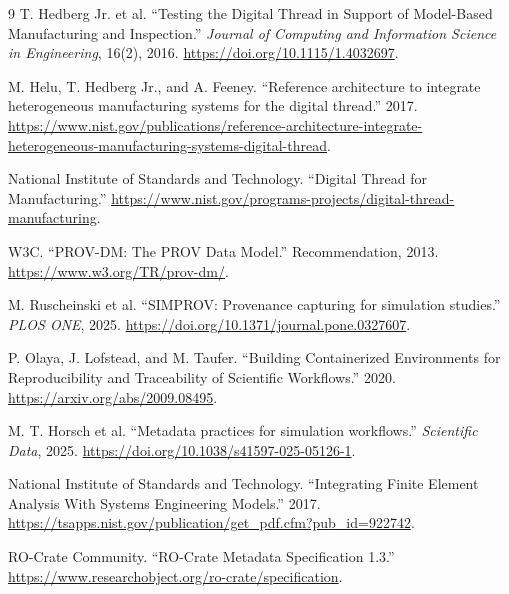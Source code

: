 \documentclass[10pt]{article}
\begin{document}
\begin{sloppypar}
\begin{thebibliography}{9}
T. Hedberg Jr. et al. ``Testing the Digital Thread in Support of Model-Based
Manufacturing and Inspection.'' \emph{Journal of Computing and Information
Science in Engineering}, 16(2), 2016. \url{https://doi.org/10.1115/1.4032697}.

M. Helu, T. Hedberg Jr., and A. Feeney. ``Reference architecture to integrate
heterogeneous manufacturing systems for the digital thread.'' 2017.
\url{https://www.nist.gov/publications/reference-architecture-integrate-heterogeneous-manufacturing-systems-digital-thread}.

National Institute of Standards and Technology. ``Digital Thread for
Manufacturing.'' \url{https://www.nist.gov/programs-projects/digital-thread-manufacturing}.

W3C. ``PROV-DM: The PROV Data Model.'' Recommendation, 2013.
\url{https://www.w3.org/TR/prov-dm/}.

M. Ruscheinski et al. ``SIMPROV: Provenance capturing for simulation studies.''
\emph{PLOS ONE}, 2025. \url{https://doi.org/10.1371/journal.pone.0327607}.

P. Olaya, J. Lofstead, and M. Taufer. ``Building Containerized Environments for
Reproducibility and Traceability of Scientific Workflows.'' 2020.
\url{https://arxiv.org/abs/2009.08495}.

M. T. Horsch et al. ``Metadata practices for simulation workflows.''
\emph{Scientific Data}, 2025. \url{https://doi.org/10.1038/s41597-025-05126-1}.

National Institute of Standards and Technology. ``Integrating Finite Element
Analysis With Systems Engineering Models.'' 2017.
\url{https://tsapps.nist.gov/publication/get_pdf.cfm?pub_id=922742}.

RO-Crate Community. ``RO-Crate Metadata Specification 1.3.''
\url{https://www.researchobject.org/ro-crate/specification}.
\end{thebibliography}
\end{sloppypar}
\end{document}
